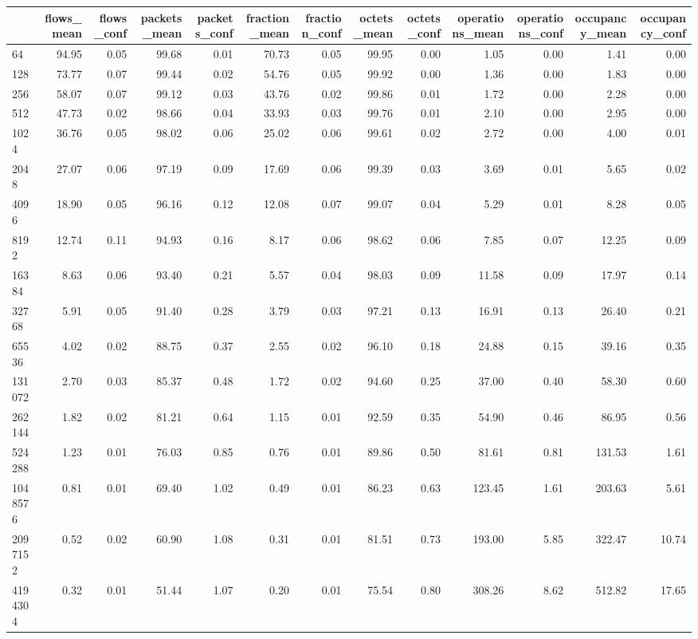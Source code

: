 \begin{tabular}{lrrrrrrrrrrrr}
\toprule
 & flows_mean & flows_conf & packets_mean & packets_conf & fraction_mean & fraction_conf & octets_mean & octets_conf & operations_mean & operations_conf & occupancy_mean & occupancy_conf \\
\midrule
64 & 94.95 & 0.05 & 99.68 & 0.01 & 70.73 & 0.05 & 99.95 & 0.00 & 1.05 & 0.00 & 1.41 & 0.00 \\
128 & 73.77 & 0.07 & 99.44 & 0.02 & 54.76 & 0.05 & 99.92 & 0.00 & 1.36 & 0.00 & 1.83 & 0.00 \\
256 & 58.07 & 0.07 & 99.12 & 0.03 & 43.76 & 0.02 & 99.86 & 0.01 & 1.72 & 0.00 & 2.28 & 0.00 \\
512 & 47.73 & 0.02 & 98.66 & 0.04 & 33.93 & 0.03 & 99.76 & 0.01 & 2.10 & 0.00 & 2.95 & 0.00 \\
1024 & 36.76 & 0.05 & 98.02 & 0.06 & 25.02 & 0.06 & 99.61 & 0.02 & 2.72 & 0.00 & 4.00 & 0.01 \\
2048 & 27.07 & 0.06 & 97.19 & 0.09 & 17.69 & 0.06 & 99.39 & 0.03 & 3.69 & 0.01 & 5.65 & 0.02 \\
4096 & 18.90 & 0.05 & 96.16 & 0.12 & 12.08 & 0.07 & 99.07 & 0.04 & 5.29 & 0.01 & 8.28 & 0.05 \\
8192 & 12.74 & 0.11 & 94.93 & 0.16 & 8.17 & 0.06 & 98.62 & 0.06 & 7.85 & 0.07 & 12.25 & 0.09 \\
16384 & 8.63 & 0.06 & 93.40 & 0.21 & 5.57 & 0.04 & 98.03 & 0.09 & 11.58 & 0.09 & 17.97 & 0.14 \\
32768 & 5.91 & 0.05 & 91.40 & 0.28 & 3.79 & 0.03 & 97.21 & 0.13 & 16.91 & 0.13 & 26.40 & 0.21 \\
65536 & 4.02 & 0.02 & 88.75 & 0.37 & 2.55 & 0.02 & 96.10 & 0.18 & 24.88 & 0.15 & 39.16 & 0.35 \\
131072 & 2.70 & 0.03 & 85.37 & 0.48 & 1.72 & 0.02 & 94.60 & 0.25 & 37.00 & 0.40 & 58.30 & 0.60 \\
262144 & 1.82 & 0.02 & 81.21 & 0.64 & 1.15 & 0.01 & 92.59 & 0.35 & 54.90 & 0.46 & 86.95 & 0.56 \\
524288 & 1.23 & 0.01 & 76.03 & 0.85 & 0.76 & 0.01 & 89.86 & 0.50 & 81.61 & 0.81 & 131.53 & 1.61 \\
1048576 & 0.81 & 0.01 & 69.40 & 1.02 & 0.49 & 0.01 & 86.23 & 0.63 & 123.45 & 1.61 & 203.63 & 5.61 \\
2097152 & 0.52 & 0.02 & 60.90 & 1.08 & 0.31 & 0.01 & 81.51 & 0.73 & 193.00 & 5.85 & 322.47 & 10.74 \\
4194304 & 0.32 & 0.01 & 51.44 & 1.07 & 0.20 & 0.01 & 75.54 & 0.80 & 308.26 & 8.62 & 512.82 & 17.65 \\

\end{tabular}
